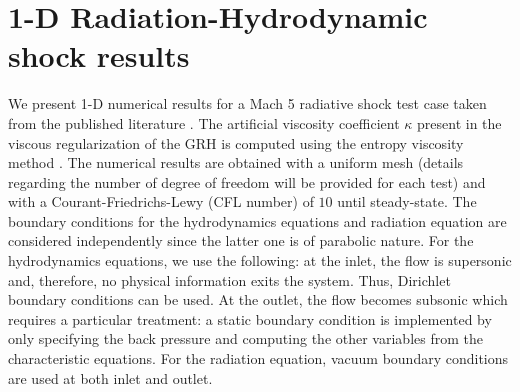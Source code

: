 \documentclass[review]{elsarticle}
\begin{document}
\section{1-D Radiation-Hydrodynamic shock results}\label{sec:num-rslt}
%
We present 1-D numerical results for a Mach 5 radiative shock test case taken from the published literature \cite{EdwardsMorelLowrie}. The artificial viscosity coefficient $\kappa$ present in the viscous regularization of the GRH is computed using the entropy viscosity method \cite{jlg1,jlg2,our_jcp_radhy_paper}. The numerical results are obtained with a uniform mesh (details regarding the number of degree of freedom will be provided for each test) and with a Courant-Friedrichs-Lewy (CFL number) of $10$ until steady-state. The boundary conditions for the hydrodynamics equations and radiation equation are considered independently since the latter one is of parabolic nature. For the hydrodynamics equations, we use the following: at the inlet, the flow is supersonic and, therefore, no physical information exits the system. Thus, Dirichlet boundary conditions can be used. At the outlet, the flow becomes subsonic which requires a particular treatment: a static boundary condition is implemented by only specifying the back pressure and computing the other variables from the characteristic equations. For the radiation equation, vacuum boundary conditions are used at both inlet and outlet. 
%
\end{document}
